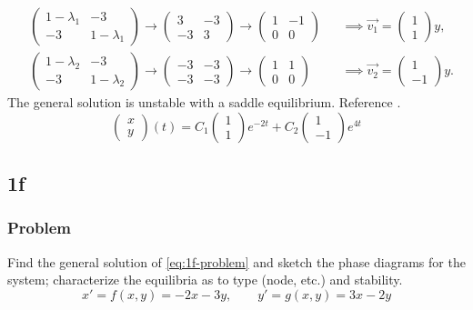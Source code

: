 \documentclass[12pt]{article}
\begin{document}
\begin{equation*}
  \begin{aligned}
    &\begin{pmatrix}1-\lambda_1&-3\\-3&1-\lambda_1\end{pmatrix}
    \rightarrow\begin{pmatrix}3&-3\\-3&3\end{pmatrix}
    \rightarrow\begin{pmatrix}1&-1\\0&0\end{pmatrix}
    &&\implies \vec{v_1} = \begin{pmatrix}1\\1\end{pmatrix}y, \\
    &\begin{pmatrix}1-\lambda_2&-3\\-3&1-\lambda_2\end{pmatrix}
    \rightarrow\begin{pmatrix}-3&-3\\-3&-3\end{pmatrix}
    \rightarrow\begin{pmatrix}1&1\\0&0\end{pmatrix}
    &&\implies \vec{v_2} = \begin{pmatrix}1\\-1\end{pmatrix}y.
  \end{aligned}
\end{equation*}
The general solution is unstable with a saddle equilibrium. Reference \todo[figure].
$$\boxed{\begin{pmatrix}x\\y\end{pmatrix}(t)=C_1\begin{pmatrix}1\\1\end{pmatrix}e^{-2t}+C_2\begin{pmatrix}1\\-1\end{pmatrix}e^{4t}}$$

\newpage
\subsection{1f}
\subsubsection*{Problem}
Find the general solution of \cref{eq:1f-problem} and sketch the phase diagrams
for the system; characterize the equilibria as to type (node, etc.) and
stability.
\begin{equation}
  \label{eq:1f-problem}
  x'=f(x,y)=-2x-3y,\qquad y'=g(x,y)=3x-2y
\end{equation}
\end{document}
